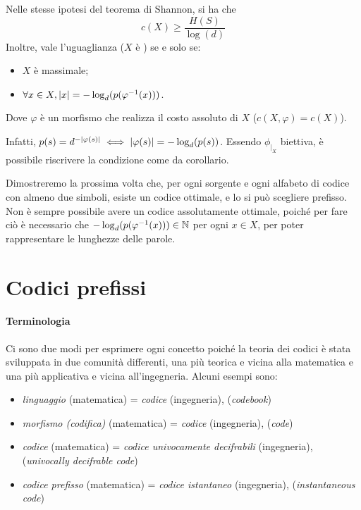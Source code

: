 \begin{corollary}
  Nelle stesse ipotesi del teorema di Shannon, si ha che
  \[c(X) \geq \frac{H(S)}{\log(d)}\]
  Inoltre, vale l'uguaglianza (\(X\) è ) se e solo se:
  \begin{itemize}
    \item \(X\) è massimale;
    \item \(\forall x \in X, \left|x\right| = -\log_d (p(\varphi^{-1}(x)))\).
  \end{itemize}
  Dove \(\varphi\) è un morfismo che realizza il costo assoluto di \(X\) (\(c(X,\varphi) = c(X)\)).
\end{corollary}
Infatti, \(p(s) = d^{-\left|\varphi(s)\right|} \iff \left|\varphi(s)\right| = -\log_d(p(s))\). Essendo \(\phi_{|_X}\) biettiva, è possibile riscrivere la condizione come da corollario.

Dimostreremo la prossima volta che, per ogni sorgente e ogni alfabeto di codice con almeno due simboli, esiste un codice ottimale, e lo si può scegliere prefisso.
Non è sempre possibile avere un codice assolutamente ottimale, poiché per fare ciò è necessario che \(-\log_d (p(\varphi^{-1}(x))) \in \mathbb{N}\) per ogni \(x \in X\), per poter rappresentare le lunghezze delle parole.

\section{Codici prefissi}

\paragraph{Terminologia}
Ci sono due modi per esprimere ogni concetto poiché la teoria dei codici è stata sviluppata in due comunità differenti, una più teorica e vicina alla matematica e una più applicativa e vicina all'ingegneria.
Alcuni esempi sono:
\begin{itemize}
  \item \emph{linguaggio} (matematica) = \emph{codice} (ingegneria),  (\emph{codebook})
  \item \emph{morfismo (codifica)} (matematica) = \emph{codice} (ingegneria), (\emph{code})
  \item \emph{codice} (matematica) = \emph{codice univocamente decifrabili} (ingegneria), (\emph{univocally decifrable code})
  \item \emph{codice prefisso} (matematica) = \emph{codice istantaneo} (ingegneria), (\emph{instantaneous code})
\end{itemize}

